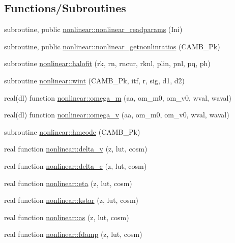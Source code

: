 \subsection*{Functions/\+Subroutines}
\begin{DoxyCompactItemize}
\item 
subroutine, public \mbox{\hyperlink{namespacenonlinear_ada72232da7963dc507bfa2f4d346e7ec}{nonlinear\+::nonlinear\+\_\+readparams}} (Ini)
\item 
subroutine, public \mbox{\hyperlink{namespacenonlinear_a0ed6b8f43af3b8a2cb369df5c247ca1f}{nonlinear\+::nonlinear\+\_\+getnonlinratios}} (C\+A\+M\+B\+\_\+\+Pk)
\item 
subroutine \mbox{\hyperlink{namespacenonlinear_a76e8738685b7ce5757290a6441d5e850}{nonlinear\+::halofit}} (rk, rn, rncur, rknl, plin, pnl, pq, ph)
\item 
subroutine \mbox{\hyperlink{namespacenonlinear_acf30963fec3b82503de7d079f4091461}{nonlinear\+::wint}} (C\+A\+M\+B\+\_\+\+Pk, itf, r, sig, d1, d2)
\item 
real(dl) function \mbox{\hyperlink{namespacenonlinear_a114a4d8047f3679297cc7b1c216d6517}{nonlinear\+::omega\+\_\+m}} (aa, om\+\_\+m0, om\+\_\+v0, wval, waval)
\item 
real(dl) function \mbox{\hyperlink{namespacenonlinear_ab10a9f1bd96361d1619be7e609ce6cb5}{nonlinear\+::omega\+\_\+v}} (aa, om\+\_\+m0, om\+\_\+v0, wval, waval)
\item 
subroutine \mbox{\hyperlink{namespacenonlinear_acf9ab8f72085502eea51c43dcf5ad67e}{nonlinear\+::hmcode}} (C\+A\+M\+B\+\_\+\+Pk)
\item 
real function \mbox{\hyperlink{namespacenonlinear_a73fccef372213a59eed00701677d1cdf}{nonlinear\+::delta\+\_\+v}} (z, lut, cosm)
\item 
real function \mbox{\hyperlink{namespacenonlinear_a927f840ecd0f2086eefba9d7220e3279}{nonlinear\+::delta\+\_\+c}} (z, lut, cosm)
\item 
real function \mbox{\hyperlink{namespacenonlinear_a96b424e6fa8e55242e57bbd2e607a70d}{nonlinear\+::eta}} (z, lut, cosm)
\item 
real function \mbox{\hyperlink{namespacenonlinear_a0e7bfac54def3a760a789b01501ee54b}{nonlinear\+::kstar}} (z, lut, cosm)
\item 
real function \mbox{\hyperlink{namespacenonlinear_a8a288f085ec2814b9d936eaff5987c9a}{nonlinear\+::as}} (z, lut, cosm)
\item 
real function \mbox{\hyperlink{namespacenonlinear_aea62820c73faaebffe8f3a0dce00a711}{nonlinear\+::fdamp}} (z, lut, cosm)

\end{DoxyCompactItemize}
